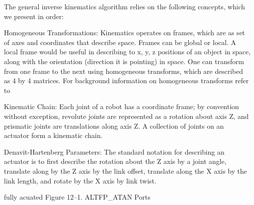 The general inverse kinematics algorithm relies on the following concepts, which we present in order:

Homogeneous Transformations: Kinematics operates on frames, which are as set of axes and coordinates that describe space. Frames can be global or local. A local frame would be useful in describing to x, y, z positions of an object in space, along with the orientation (direction it is pointing) in space. One can transform from one frame to the next using homogeneous transforms, which are described as 4 by 4 matrices. For background information on homogeneous transforms refer to \cite{frames}

Kinematic Chain:
Each joint of a robot has a coordinate frame; by convention without exception, revolute joints are represented as a rotation about axis Z, and prismatic joints are translations along axis Z. A collection of joints on an actuator form a kinematic chain.

Denavit-Hartenberg Parameters:
The standard notation for describing an actuator is to first describe the rotation about the Z axis by a joint angle, translate along by the Z axis by the link offset, translate along the X axis by the link length, and rotate by the X axis by link twist.

fully acuated
Figure 12–1. ALTFP_ATAN Ports



